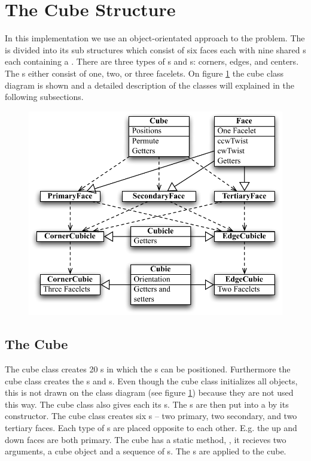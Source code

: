 \section{The Cube Structure}
In this implementation we use an object-orientated approach to the problem.
The \rubik{} is divided into its sub structures which consist of six faces each with nine shared \cubicle{}s each containing a \cubie{}.
There are three types of \cpiece{}s and \cubicle{}s: corners, edges, and centers. 
The \cubie{}s either consist of one, two, or three facelets.
On figure \ref{fig:cubeClassDiagram} the cube class diagram is shown and a detailed description of the classes will explained in the following subsections.

\begin{figure}[htbp]
	\centering
		\includegraphics[scale=0.75]{input/pics/cubeClassDiagram.pdf}
	\caption{}
	\label{fig:cubeClassDiagram}
\end{figure}

\subsection{The Cube}
The cube class creates 20 \cubicle{}s in which the \cpiece{}s can be positioned. Furthermore the cube class creates the \face{}s and \cubie{}s. Even though the cube class initializes all objects, this is not drawn on the class diagram (see figure \ref{fig:cubeClassDiagram}) because they are not used this way. The cube class also gives each \cpiece{} its \facelet{}s. The \cubicle{}s are then put into a \face{} by its constructor. The cube class creates six \face{}s -- two primary, two secondary, and two tertiary faces. Each type of \face{}s are placed opposite to each other. E.g. the up and down faces are both primary. The cube has a static method, , it recieves two arguments, a cube object and a sequence of \twist{}s. The \twist{}s are applied to the cube.

